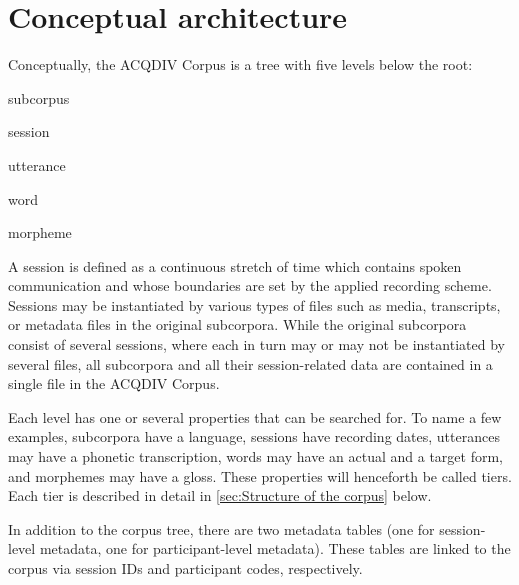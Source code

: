\documentclass[a4paper, 11pt]{book}
\begin{document}
\section{Conceptual architecture}
\label{sec:Architecture}

Conceptually, the ACQDIV Corpus is a tree with five levels below the root: 

\begin{itemize*}
	\item subcorpus
	\item session
	\item utterance
	\item word 
	\item morpheme
\end{itemize*}

A session is defined as a continuous stretch of time which contains spoken communication and whose boundaries are set by the applied recording scheme. Sessions may be instantiated by various types of files such as media, transcripts, or metadata files in the original subcorpora. While the original subcorpora consist of several sessions, where each in turn may or may not be instantiated by several files, all subcorpora and all their session-related data are contained in a single file in the ACQDIV Corpus. 

Each level has one or several properties that can be searched for. To name a few examples, subcorpora have a language, sessions have recording dates, utterances may have a phonetic transcription, words may have an actual and a target form, and morphemes may have a gloss. These properties will henceforth be called tiers. Each tier is described in detail in \autoref{sec:Structure of the corpus} below. 

In addition to the corpus tree, there are two metadata tables (one for session-level metadata, one for participant-level metadata). These tables are linked to the corpus via session IDs and participant codes, respectively. 

%
\end{document}
